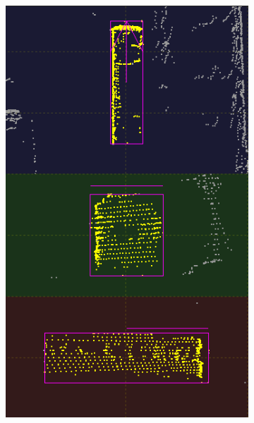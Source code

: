 \documentclass[letterpaper, 10 pt, conference]{ieeeconf}  %
\begin{document}
\begin{figure}[th]
\begin{subfigure}{0.16\linewidth}
		\caption{}
	\end{subfigure}
	~
	\begin{subfigure}{0.16\linewidth}
		\includegraphics[scale=0.12]{./figures/transfer/bus-2}
		\caption{}
	\end{subfigure}
	~
	\begin{subfigure}{0.16\linewidth}

\end{subfigure}
\end{figure}
\end{document}

